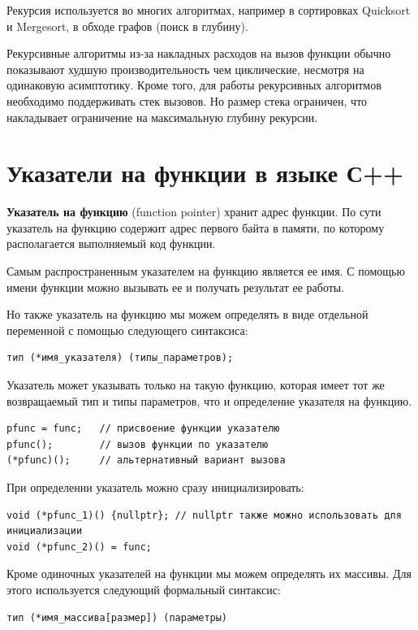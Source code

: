 Рекурсия используется во многих алгоритмах, например в сортировках Quicksort и Mergesort, в обходе графов (поиск в глубину).

Рекурсивные алгоритмы из-за накладных расходов на вызов функции обычно показывают худшую производительность чем циклические, несмотря на одинаковую
асимптотику. Кроме того, для работы рекурсивных алгоритмов необходимо поддерживать стек вызовов. Но размер стека ограничен, что накладывает ограничение на максимальную глубину рекурсии.

\section{Указатели на функции в языке С++}

\textbf{Указатель на функцию} (function pointer) хранит адрес функции. По сути указатель на функцию содержит адрес первого байта в памяти, по которому располагается выполняемый код функции.

Самым распространенным указателем на функцию является ее имя. С помощью имени функции можно вызывать ее и получать результат ее работы.

Но также указатель на функцию мы можем определять в виде отдельной переменной с помощью следующего синтаксиса:

\begin{verbatim}
тип (*имя_указателя) (типы_параметров);
\end{verbatim}

Указатель может указывать только на такую функцию, которая имеет тот же возвращаемый тип и типы параметров, что и определение указателя на функцию.

\begin{verbatim}
pfunc = func;   // присвоение функции указателю
pfunc();        // вызов функции по указателю
(*pfunc)();     // альтернативный вариант вызова
\end{verbatim}

При определении указатель можно сразу инициализировать:

\begin{verbatim}
void (*pfunc_1)() {nullptr}; // nullptr также можно использовать для инициализации
void (*pfunc_2)() = func;
\end{verbatim}

Кроме одиночных указателей на функции мы можем определять их массивы. Для этого используется следующий формальный синтаксис:

\begin{verbatim}
тип (*имя_массива[размер]) (параметры)
\end{verbatim}

